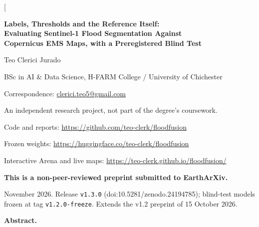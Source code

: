 \documentclass[10pt,twocolumn,a4paper]{article}
\begin{document}
\twocolumn[{%
\begin{center}
  {\LARGE\bfseries Labels, Thresholds and the Reference Itself:\\[3pt]
   Evaluating Sentinel-1 Flood Segmentation Against\\[3pt] Copernicus EMS Maps, with a Preregistered Blind Test\par}
  \vspace{9pt}
  {\large Teo Clerici Jurado\par}
  \vspace{2pt}
  {\small BSc in AI \& Data Science, H-FARM College / University of Chichester\par}
  {\small Correspondence: \href{mailto:clerici.teo5@gmail.com}{clerici.teo5@gmail.com}\par}
  {\footnotesize An independent research project, not part of the degree's coursework.\par}
  \vspace{5pt}
  {\small Code and reports: \url{https://github.com/teo-clerk/floodfusion}\par}
  {\small Frozen weights: \url{https://huggingface.co/teo-clerk/floodfusion}\par}
  {\small Interactive Arena and live maps: \url{https://teo-clerk.github.io/floodfusion/}\par}
  \vspace{2pt}
  {\footnotesize\bfseries This is a non-peer-reviewed preprint submitted to EarthArXiv.\par}
  {\footnotesize November 2026. Release \texttt{v1.3.0} (doi:10.5281/zenodo.24194785); blind-test models frozen at tag
   \texttt{v1.2.0-freeze}. Extends the v1.2 preprint of 15 October 2026.\par}
\end{center}
\vspace{2pt}
\begin{center}
\begin{minipage}{0.9\textwidth}
\small
\noindent\textbf{Abstract.}

\end{minipage}
\end{center}}
\end{document}
